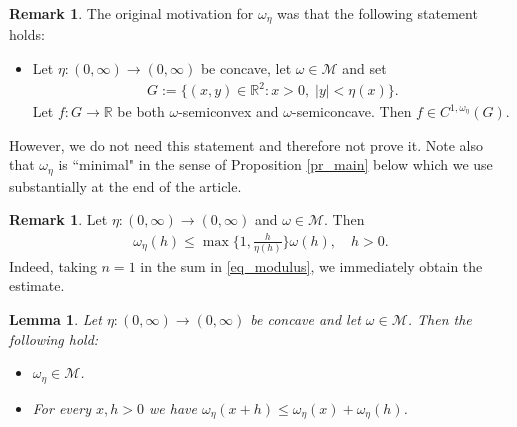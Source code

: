 \documentclass[10pt,a4paper]{amsart}
\newtheorem{lemma}[theorem]{Lemma}
\theoremstyle{definition}
\newtheorem{remark}[theorem]{Remark}
\newcommand{\R}{\mathbb{R}}
\newcommand{\M}{\mathcal{M}}
\begin{document}
\begin{remark}\label{re_f}
The original motivation for $ \omega_{\eta} $ was that the following statement holds:
\begin{itemize}
\item Let $ \eta:(0,\infty)\to(0,\infty) $ be concave, let $ \omega\in\M $ and set
\begin{align*}
G:=\lbrace(x,y)\in\R^2:x>0,\;\vert y\vert<\eta(x)\rbrace.
\end{align*}
Let $ f:G\to\R $ be both $ \omega $-semiconvex and $ \omega $-semiconcave. Then $ f\in C^{1,\omega_{\eta}}(G) $.
\end{itemize}
However, we do not need this statement and therefore not prove it. Note also that $ \omega_{\eta} $ is ``minimal" in the sense of Proposition \ref{pr_main} below which we use substantially at the end of the article.
\end{remark}



\begin{remark}\label{re_trivial}
Let $ \eta:(0,\infty)\to(0,\infty) $ and $ \omega\in\M $. Then
\begin{align*}
\omega_{\eta}(h)\leq\max\bigg\lbrace 1,\frac{h}{\eta(h)}\bigg\rbrace\omega(h),\quad h>0.
\end{align*}
Indeed, taking $ n=1 $ in the sum in \eqref{eq_modulus}, we immediately obtain the estimate.
\end{remark}

\begin{lemma}\label{le_modulus}
Let $ \eta:(0,\infty)\to(0,\infty) $ be concave and let $ \omega\in\M $. Then the following hold:
\begin{itemize}
\item[(i)] $ \omega_{\eta}\in\M $.
\item[(ii)] For every $ x,h>0 $ we have $ \omega_{\eta}(x+h)\leq\omega_{\eta}(x)+\omega_{\eta}(h) $.
\end{itemize}
\end{lemma}
\end{document}
